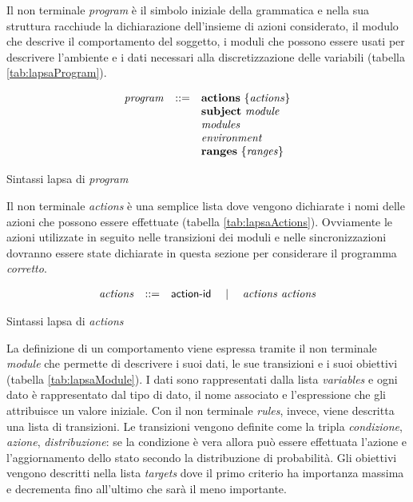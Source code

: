 Il non terminale \emph{program} è il simbolo iniziale della grammatica e nella sua struttura racchiude la dichiarazione dell'insieme di azioni considerato, il modulo che descrive il comportamento del soggetto, i moduli che possono essere usati per descrivere l'ambiente e i dati necessari alla discretizzazione delle variabili (tabella \ref{tab:lapsaProgram}).

\begin{table}[htbp!] %
$$
\begin{array}{rcl}
	\mathit{program} &::=& \mathbf{actions} \mbox{ } \{ \mathit{actions} \} \\
		&& \mathbf{subject} \mbox{ } \mathit{module} \\
		&& \mathit{modules} \\
		&& \mathit{environment} \\
		&& \mathbf{ranges} \mbox{ } \{ \mathit{ranges} \} \\
\end{array}
$$
\caption{Sintassi \ac{lapsa} di \emph{program}}
\label{tab:lapsaProgram}
\end{table}

Il non terminale \emph{actions} è una semplice lista dove vengono dichiarate i nomi delle azioni che possono essere effettuate (tabella \ref{tab:lapsaActions}). Ovviamente le azioni utilizzate in seguito nelle transizioni dei moduli e nelle sincronizzazioni dovranno essere state dichiarate in questa sezione per considerare il programma \emph{corretto}.

\begin{table}[htbp!] %
$$
\begin{array}{rcl}
	\mathit{actions} &::=& {\sf action}\textrm{-}{\sf id} \quad\mid\quad \mathit{actions} \mbox{ } \mathit{actions} \\
\end{array}
$$
\caption{Sintassi \ac{lapsa} di \emph{actions}}
\label{tab:lapsaActions}
\end{table}

La definizione di un comportamento viene espressa tramite il non terminale \emph{module} che permette di descrivere i suoi dati, le sue transizioni e i suoi obiettivi (tabella \ref{tab:lapsaModule}). I dati sono rappresentati dalla lista \emph{variables} e ogni dato è rappresentato dal tipo di dato, il nome associato e l'espressione che gli attribuisce un valore iniziale. Con il non terminale \emph{rules}, invece, viene descritta una lista di transizioni. Le transizioni vengono definite come la tripla \emph{condizione}, \emph{azione}, \emph{distribuzione}: se la condizione è vera allora può essere effettuata l'azione e l'aggiornamento dello stato secondo la distribuzione di probabilità. Gli obiettivi vengono descritti nella lista \emph{targets} dove il primo criterio ha importanza massima e decrementa fino all'ultimo che sarà il meno importante.


